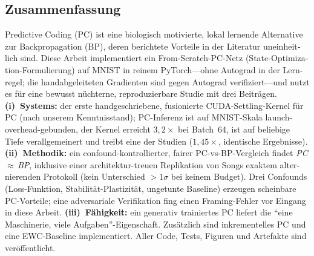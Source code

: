 \vspace{1cm}
\begin{otherlanguage}{ngerman}
\section*{Zusammenfassung}

Predictive Coding (PC) ist eine biologisch motivierte, lokal lernende Alternative zur
Backpropagation (BP), deren berichtete Vorteile in der Literatur uneinheitlich sind. Diese
Arbeit implementiert ein From-Scratch-PC-Netz (State-Optimization-Formulierung) auf MNIST in
reinem PyTorch---ohne Autograd in der Lernregel; die handabgeleiteten Gradienten sind gegen
Autograd verifiziert---und nutzt es f\"ur eine bewusst n\"uchterne, reproduzierbare Studie mit
drei Beitr\"agen. \textbf{(i)~Systems:} der erste handgeschriebene, fusionierte CUDA-Settling-Kernel
f\"ur PC (nach unserem Kenntnisstand); PC-Inferenz ist auf MNIST-Skala launch-overhead-gebunden,
der Kernel erreicht $3{,}2\times$ bei Batch~64, ist auf beliebige Tiefe verallgemeinert und treibt
eine der Studien ($1{,}45\times$, identische Ergebnisse). \textbf{(ii)~Methodik:} ein
confound-kontrollierter, fairer PC-vs-BP-Vergleich findet \emph{PC\,$\approx$\,BP}, inklusive einer
architektur-treuen Replikation von Songs exaktem alternierenden Protokoll (kein Unterschied
$>1\sigma$ bei keinem Budget). Drei Confounds (Loss-Funktion, Stabilit\"at-Plastizit\"at,
ungetunte Baseline) erzeugen scheinbare PC-Vorteile; eine adversariale Verifikation fing einen
Framing-Fehler vor Eingang in diese Arbeit. \textbf{(iii)~F\"ahigkeit:} ein generativ trainiertes
PC liefert die ``eine Maschinerie, viele Aufgaben''-Eigenschaft. Zus\"atzlich sind inkrementelles
PC und eine EWC-Baseline implementiert. Aller Code, Tests, Figuren und Artefakte sind
ver\"offentlicht.
\end{otherlanguage}

